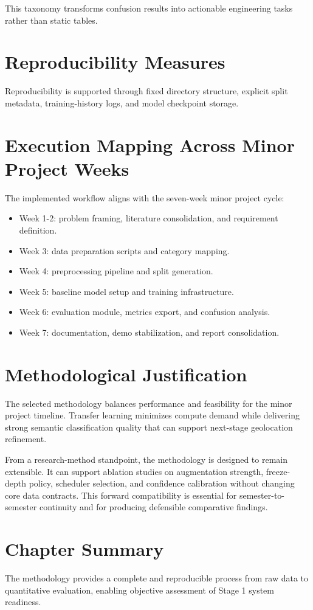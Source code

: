 This taxonomy transforms confusion results into actionable engineering tasks rather than static tables.

\section{Reproducibility Measures}
Reproducibility is supported through fixed directory structure, explicit split metadata, training-history logs, and model checkpoint storage.

\section{Execution Mapping Across Minor Project Weeks}
The implemented workflow aligns with the seven-week minor project cycle:
\begin{itemize}
\item Week 1-2: problem framing, literature consolidation, and requirement definition.
\item Week 3: data preparation scripts and category mapping.
\item Week 4: preprocessing pipeline and split generation.
\item Week 5: baseline model setup and training infrastructure.
\item Week 6: evaluation module, metrics export, and confusion analysis.
\item Week 7: documentation, demo stabilization, and report consolidation.
\end{itemize}

\section{Methodological Justification}
The selected methodology balances performance and feasibility for the minor project timeline. Transfer learning minimizes compute demand while delivering strong semantic classification quality that can support next-stage geolocation refinement.

From a research-method standpoint, the methodology is designed to remain extensible. It can support ablation studies on augmentation strength, freeze-depth policy, scheduler selection, and confidence calibration without changing core data contracts. This forward compatibility is essential for semester-to-semester continuity and for producing defensible comparative findings.

\section{Chapter Summary}
The methodology provides a complete and reproducible process from raw data to quantitative evaluation, enabling objective assessment of Stage 1 system readiness.
